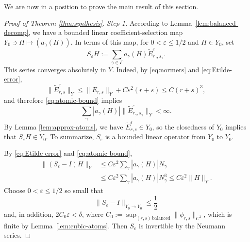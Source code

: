 \documentclass[10pt,a4paper]{amsart}
\begin{document}
We are now in a position to prove the main result of this section.


\begin{proof}[Proof of Theorem \ref{thm:synthesis}]
\emph{Step 1.}
According to Lemma~\ref{lem:balanced-decomp}, we have a bounded linear coefficient-selection map $Y_0\ni H \mapsto (a_\gamma(H))$. In terms of this map, for $0<\varepsilon\leq1/2$ and $H\in Y_0$, set
\begin{equation}\label{eq:S-epsilon}
 S_\varepsilon H
 :=\sum_{\gamma\in\Gamma} a_\gamma(H)
 \widetilde E_{r_\gamma,s_\gamma}^{\varepsilon}.
\end{equation}
This series converges absolutely in $Y$. Indeed, by \eqref{eq:normers} and \eqref{eq:Etilde-error},
\[
 \|\widetilde E_{r,s}^{\varepsilon}\|_Y
 \leq \|E_{r,s}\|_Y+C\varepsilon^2(r+s)
 \leq C(r+s)^3,
\]
and therefore \eqref{eq:atomic-bound} implies
\[
 \sum_\gamma |a_\gamma(H)|
 \|\widetilde E_{r_\gamma,s_\gamma}^{\varepsilon}\|_Y
 <\infty.
\]
By Lemma \ref{lem:approx-atoms}, we have $\widetilde E_{r,s}^{\varepsilon}\in Y_0$, so the closedness of $Y_0$ implies that $S_\varepsilon H\in Y_0$. To summarize, $S_\varepsilon$ is a bounded linear operator from $Y_0$ to $Y_0$.

By \eqref{eq:Etilde-error} and \eqref{eq:atomic-bound},
\begin{align*}
 \|(S_\varepsilon-I)H\|_Y
 &\leq C\varepsilon^2
 \sum_\gamma|a_\gamma(H)|N_\gamma\\
 &\leq C\varepsilon^2
 \sum_\gamma|a_\gamma(H)|N_\gamma^3
 \leq C\varepsilon^2\|H\|_Y.
\end{align*}
Choose $0<\varepsilon\leq1/2$ so small that
\begin{equation}\label{eq:Neumann-small}
 \|S_\varepsilon-I\|_{Y_0\to Y_0} \leq \frac12
\end{equation}
and, in addition, $2C_0\varepsilon<\delta$, where $C_0:= \sup_{(r,s) \,\mathrm{balanced}} \|\phi_{r,s}\|_{C^1}$, which is finite by Lemma~\ref{lem:cubic-atoms}.  Then $S_\varepsilon$ is invertible by the Neumann series.  

\medskip


\end{proof}
\end{document}
